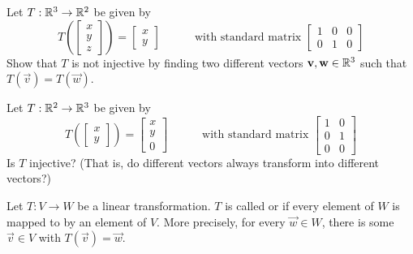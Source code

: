 \begin{applicationActivities}
\begin{activity}{3}
Let $T: \mathbb{R}^3 \rightarrow \mathbb{R}^2$ be given by
\[
  T\left(\begin{bmatrix}x \\ y\\z \end{bmatrix} \right)
    =
  \begin{bmatrix} x \\ y \end{bmatrix}
    \hspace{3em}
    \text{with standard matrix }
  \begin{bmatrix} 1 & 0 & 0 \\ 0 & 1 & 0 \end{bmatrix}
\]
Show that \(T\) is not injective by finding two different vectors
\(\mathbf v,\mathbf w\in\mathbb{R}^3\) such that \(T(\vec v)=T(\vec w)\).
\end{activity}

\begin{activity}{2}
Let $T: \mathbb{R}^2 \rightarrow \mathbb{R}^3$ be given by
\[
  T\left(\begin{bmatrix}x \\ y \end{bmatrix} \right)
    =
  \begin{bmatrix} x \\ y \\ 0 \end{bmatrix}
    \hspace{3em}
    \text{with standard matrix }
  \begin{bmatrix} 1 & 0 \\ 0 & 1 \\ 0 & 0 \end{bmatrix}
\]
Is $T$ injective? (That is, do different vectors always transform into
different vectors?)
\end{activity}

\begin{definition}
Let $T: V \rightarrow W$ be a linear transformation.
$T$ is called  or  if every element of $W$ is mapped to by an element of $V$.  More precisely, for every $\vec{w} \in W$, there is some $\vec{v} \in V$ with $T(\vec{v})=\vec{w}$.
\end{definition}


\end{applicationActivities}
